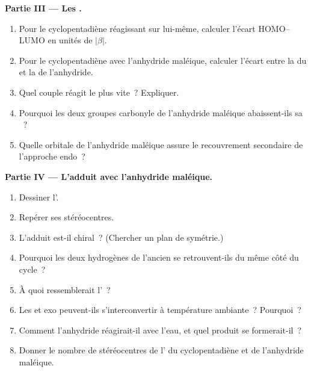 \begin{problem}
\medskip
\noindent\textbf{Partie III --- Les .}
\begin{enumerate}[resume]
  \item Pour le cyclopentadiène réagissant sur lui-même, calculer l'écart HOMO--LUMO en unités de
        $|\beta|$.
  \item Pour le cyclopentadiène avec l'anhydride maléique, calculer l'écart entre la  du
         et la  de l'anhydride.
  \item Quel couple réagit le plus vite~? Expliquer.
  \item Pourquoi les deux groupes carbonyle de l'anhydride maléique abaissent-ils sa ~?
  \item Quelle orbitale de l'anhydride maléique assure le recouvrement secondaire de l'approche
        endo~?
\end{enumerate}

\medskip
\noindent\textbf{Partie IV --- L'adduit avec l'anhydride maléique.}
\begin{enumerate}[resume]
  \item Dessiner l'.
  \item Repérer ses stéréocentres.
  \item L'adduit est-il chiral~? (Chercher un plan de symétrie.)
  \item Pourquoi les deux hydrogènes de l'ancien  se retrouvent-ils du même côté du
        cycle~?
  \item À quoi ressemblerait l'~?
  \item Les  et exo peuvent-ils s'interconvertir à température ambiante~? Pourquoi~?
  \item Comment l'anhydride réagirait-il avec l'eau, et quel produit se formerait-il~?
  \item Donner le nombre de stéréocentres de l' du cyclopentadiène et de
        l'anhydride maléique.
\end{enumerate}
\end{problem}
